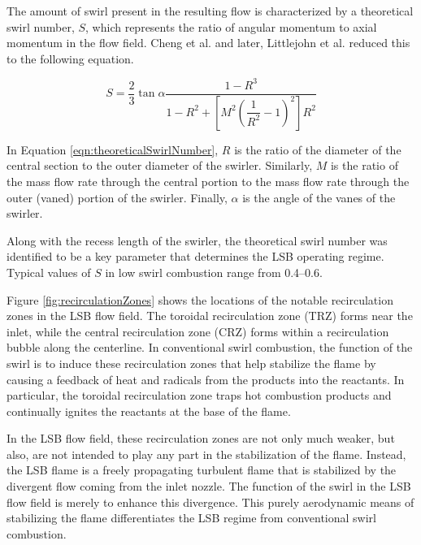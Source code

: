 The amount of swirl present in the resulting flow is characterized by a theoretical swirl number, \(S\), which represents the ratio of angular momentum to axial momentum in the flow field.
Cheng et al.\cite{2000-cheng} and later, Littlejohn et al.\cite{2002-littlejohn} reduced this to the following equation.

\begin{equation}
S = \frac{2}{3} \tan \alpha \frac{ 1 - R^3 }{ 1 - R^2 + \left[ M^2\left( \dfrac{1}{R^2} - 1 \right)^2 \right]R^2}
\label{eqn:theoreticalSwirlNumber}
\end{equation}

In Equation \ref{eqn:theoreticalSwirlNumber}, \(R\) is the ratio of the diameter of the central section to the outer diameter of the swirler.
Similarly, \(M\) is the ratio of the mass flow rate through the central portion to the mass flow rate through the outer (vaned) portion of the swirler.
Finally, \(\alpha\) is the angle of the vanes of the swirler.

Along with the recess length of the swirler, the theoretical swirl number was identified to be a key parameter that determines the LSB operating regime.\cite{2002-littlejohn}
Typical values of \(S\) in low swirl combustion range from 0.4--0.6.



Figure \ref{fig:recirculationZones} shows the locations of the notable recirculation zones in the LSB flow field.
The toroidal recirculation zone (TRZ) forms near the inlet, while the central recirculation zone (CRZ) forms within a recirculation bubble along the centerline.
In conventional swirl combustion, the function of the swirl is to induce these recirculation zones that help stabilize the flame by causing a feedback of heat and radicals from the products into the reactants.
In particular, the toroidal recirculation zone traps hot combustion products and continually ignites the reactants at the base of the flame.\cite{2005-johnson}

In the LSB flow field, these recirculation zones are not only much weaker, but also, are not intended to play any part in the stabilization of the flame.
Instead, the LSB flame is a freely propagating turbulent flame that is stabilized by the divergent flow coming from the inlet nozzle.
The function of the swirl in the LSB flow field is merely to enhance this divergence.
This purely aerodynamic means of stabilizing the flame differentiates the LSB regime from conventional swirl combustion.

